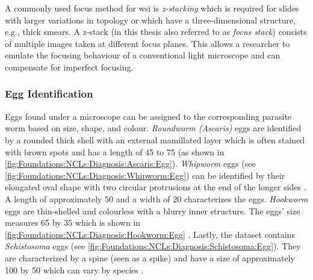 A commonly used focus method for \ac{wsi} is \emph{z-stacking} \cite{el-gabry2014wholeslide} which is required for slides with larger variations in topology or which have a three-dimensional structure, e.g., thick smears. A z-stack (in this thesis also referred to as \emph{focus stack}) consists of multiple images taken at different focus planes. This allows a researcher to emulate the focusing behaviour of a conventional light microscope and can compensate for imperfect focusing.


\subsubsection{Egg Identification}
\label{sec:Foundations:NTDs:Diagnosis:Identification}

Eggs found under a microscope can be assigned to the corresponding parasite worm based on size, shape, and colour. \emph{Roundworm (Ascaris)} eggs are identified by a rounded thick shell with an external mamillated layer which is often stained with brown spots and has a length of \unit{45}{\micro\meter} to \unit{75}{\micro\meter} \cite{dpdx2019ascariasis} (as shown in \autoref{fig:Foundations:NCLs:Diagnosis:Ascaris:Egg}).
\emph{Whipworm} eggs (see \autoref{fig:Foundations:NCLs:Diagnosis:Whipworm:Egg}) can be identified by their elongated oval shape with two circular protrusions at the end of the longer sides \cite{dpdx2017trichuriasis,larsson2020development}. A length of approximately \unit{50}{\micro\meter} and a width of \unit{20}{\micro\meter} characterizes the eggs.
\emph{Hookworm} eggs are thin-shelled and colourless with a blurry inner structure. The eggs' size measures \unit{65}{\micro\meter} by \unit{35}{\micro\meter} which is shown in \autoref{fig:Foundations:NCLs:Diagnosis:Hookworm:Egg} \cite{dpdx2019hookworm, larsson2020development}.
Lastly, the dataset contains \emph{Schistosoma} eggs (see \autoref{fig:Foundations:NCLs:Diagnosis:Schistosoma:Egg}). They are characterized by a spine (seen as a spike) 
and have a size of approximately \unit{100}{\micro\meter} by \unit{50}{\micro\meter} which can vary by species \cite{dpdx2019schistosomiasis, larsson2020development}.

